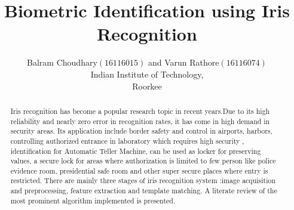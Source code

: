 \documentclass[conference]{Iris_detect}
\begin{document}
\title{Biometric Identification using Iris Recognition}

\author{Balram Choudhary$(16116015)$ and Varun Rathore$(16116074)$\\ Indian Institute of Technology,\\Roorkee 
}
\maketitle
\begin{abstract}
Iris recognition has become a popular research topic in recent years.Due to its high reliability and nearly zero error in recognition rates, it has come in high demand in security areas. Its application include border safety and control in airports, harbors, controlling authorized entrance in laboratory which requires high security , identification for Automatic Teller Machine, can be used as locker for preserving values, a secure lock for areas where authorization is limited to few person like police evidence room, presidential safe room and other super secure places where entry is restricted. There are mainly three stages of iris recognition system :image acquisition and preprocessing, feature extraction and template matching. A literate review of the most prominent algorithm implemented is presented.
\end{abstract}
\IEEEpeerreviewmaketitle
\end{document}
